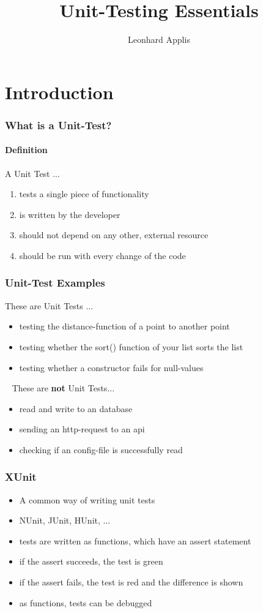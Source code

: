 \documentclass[12pt]{beamer}
\begin{document}
	\author{Leonhard Applis}
	\title{Unit-Testing Essentials}
	\begin{frame}[plain]
		\maketitle
	\end{frame}
	
	\section{Introduction}
	
	\begin{frame}
		\frametitle{What is a Unit-Test?}
		\framesubtitle{Definition}
		A Unit Test ... 
		\begin{enumerate}
			\item tests a single piece of functionality
			\item is written by the developer
			\item should not depend on any other, external resource
			\item should be run with every change of the code
		\end{enumerate}
	\end{frame}

	\begin{frame}
		\frametitle{Unit-Test Examples}
		These are Unit Tests ...
		\begin{itemize}
			\item testing the distance-function of a point to another point
			\item testing whether the sort() function of your list sorts the list 
			\item testing whether a constructor fails for null-values
		\end{itemize}
		~\newline
		These are \textbf{not} Unit Tests...
		\begin{itemize}
			\item read and write to an database 
			\item sending an http-request to an api 
			\item checking if an config-file is successfully read
		\end{itemize}
	\end{frame}

	\begin{frame}
		\frametitle{XUnit}
		\begin{itemize}
			\item A common way of writing unit tests
			\item NUnit, JUnit, HUnit, ...
			\item tests are written as functions, which have an assert statement
			\item if the assert succeeds, the test is green
			\item if the assert fails, the test is red and the difference is shown
			\item as functions, tests can be debugged
		\end{itemize}
	\end{frame}
	
\end{document}
